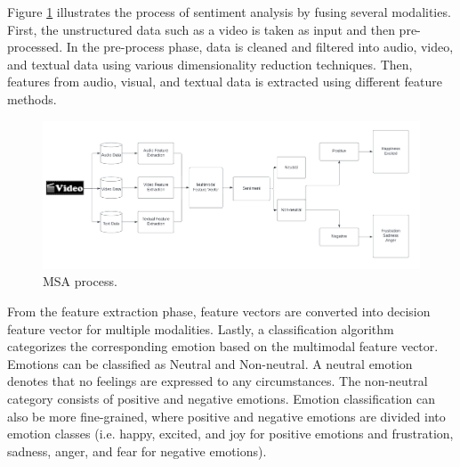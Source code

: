 Figure \ref{fig:msa_process} illustrates the process of sentiment analysis by fusing several modalities. First, the unstructured data such as a video is taken as input and then pre-processed. In the pre-process phase, data is cleaned and filtered into audio, video, and textual data using various dimensionality reduction techniques. Then, features from audio, visual, and textual data is extracted using different feature methods.  
%
\begin{figure}[h]
  \centering
  \includegraphics[width=\textwidth]{figures/msa_process_dpi.png}
  \caption{MSA process.}
  \label{fig:msa_process}
\end{figure}
%
From the feature extraction phase, feature vectors are converted into decision feature vector for multiple modalities. Lastly, a classification algorithm categorizes the corresponding emotion based on the multimodal feature vector. Emotions can be classified as Neutral and Non-neutral. A neutral emotion denotes that no feelings are expressed to any circumstances. The non-neutral category consists of positive and negative emotions. Emotion classification can also be more fine-grained, where positive and negative emotions are divided into emotion classes (i.e. happy, excited, and joy for positive emotions and frustration, sadness, anger, and fear for negative emotions). \\

